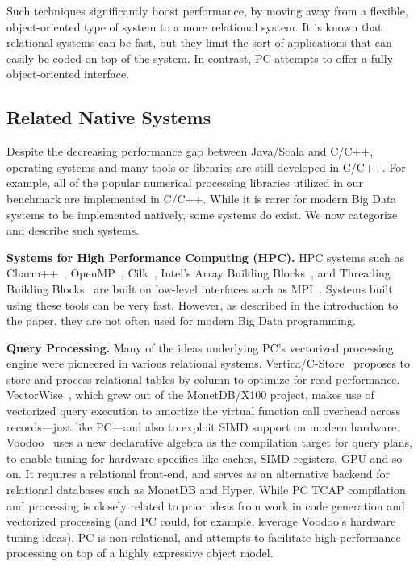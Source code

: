 Such techniques significantly boost performance, by moving away from a flexible, object-oriented
type of system to a more relational system.
It is known that relational systems can be fast, but they limit the sort of applications that
can easily be coded on top of the system.  In contrast, PC attempts to offer a fully 
object-oriented interface.

\subsection {Related Native Systems}
Despite the decreasing performance gap between Java/Scala and C/C++,
operating systems and many tools or libraries are still developed in C/C++. For example,
all of the popular numerical processing libraries utilized in our benchmark are
implemented in C/C++. 
While it is rarer for modern Big Data systems to be implemented natively, some systems do exist.
We now categorize and describe such systems.

\vspace{5pt} 
\noindent
\textbf{Systems for High Performance Computing (HPC).} HPC
systems such as Charm++~\cite{kale1993charm++}, OpenMP~\cite{dagum1998openmp}, Cilk~\cite{blumofe1996cilk},  Intel's Array Building
Blocks~\cite{newburn2011intel}, and Threading Building Blocks~\cite{reinders2007intel} are built on
low-level interfaces such as MPI~\cite{gropp1996high}.
Systems built using these tools can be very fast.  However, as described in the introduction to the paper, they are not often used
for modern Big Data programming.

\vspace{5pt} 
\noindent
\textbf{Query Processing.} Many of the ideas underlying PC's vectorized processing engine
were pioneered in various relational systems.  Vertica/C-Store~\cite{stonebraker2005c} proposes
to store and process relational tables by
column to optimize for read performance.
VectorWise~\cite{zukowski2012vectorwise}, which grew out of the MonetDB/X100 project, makes use of
vectorized query execution to amortize the virtual function call overhead across records---just like PC---and also
to exploit SIMD support
on modern hardware. Voodoo~\cite{pirk2016voodoo} uses a new
declarative algebra as the compilation target for query plans, to
enable tuning for hardware specifics like caches, SIMD registers,
GPU and so on. It requires a relational front-end, and serves as an alternative backend for
relational databases such as MonetDB and Hyper. While PC TCAP compilation
and processing is closely related to prior ideas from work in 
code generation and vectorized processing (and PC could, for example,
leverage Voodoo's hardware tuning ideas), PC is non-relational, and attempts to
facilitate high-performance processing on top of a 
highly expressive object model.

